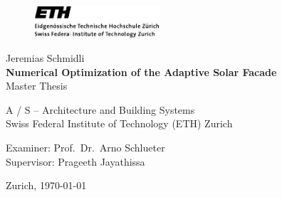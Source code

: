 \begin{titlepage}
\begin{center}

\begin{figure}[!ht]
\includegraphics[height=12mm]{figures/ethlogo}
\hfill
\end{figure}

\vspace{30mm} Jeremias Schmidli \\
\vspace{10mm} \textbf{\LARGE Numerical Optimization of the Adaptive Solar Facade} \\
\vspace{10mm} Master Thesis \\ 

\vfill

A / S -- Architecture and Building Systems \\ Swiss Federal Institute of Technology (ETH) Zurich \\

\vspace{5mm}

Examiner: Prof.~Dr.~Arno Schlueter \\
Supervisor: Prageeth Jayathissa

\vspace{5mm} Zurich, \today

\end{center}
\end{titlepage}
